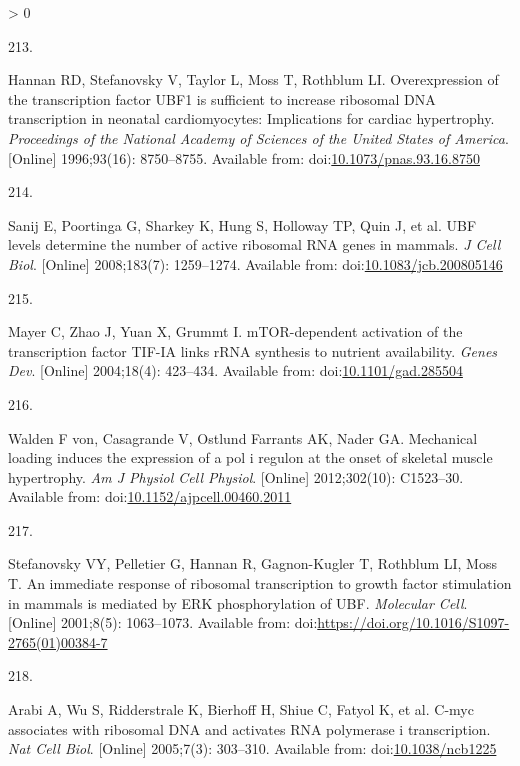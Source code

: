 \documentclass[twoside,10pt]{gihclass} %
\newlength{\cslhangindent}
\newlength{\csllabelwidth}
\newenvironment{CSLReferences}[3] %
 {%
  \setlength{\parindent}{0pt}
  \ifodd #1 \everypar{\setlength{\hangindent}{\cslhangindent}}\ignorespaces\fi
  \ifnum #2 > 0
  \setlength{\parskip}{#2\baselineskip}
  \fi
 }%
 {}
\newcommand{\CSLLeftMargin}[1]{\parbox[t]{\maxof{\widthof{#1}}{\csllabelwidth}}{#1}}
\newcommand{\CSLRightInline}[1]{\parbox[t]{\linewidth}{#1}}
\begin{document}
\begin{CSLReferences}{0}{0}
\leavevmode\hypertarget{ref-RN2566}{}%
\CSLLeftMargin{213. }
\CSLRightInline{Hannan RD, Stefanovsky V, Taylor L, Moss T, Rothblum LI. Overexpression of the transcription factor UBF1 is sufficient to increase ribosomal DNA transcription in neonatal cardiomyocytes: Implications for cardiac hypertrophy. \emph{Proceedings of the National Academy of Sciences of the United States of America}. {[}Online{]} 1996;93(16): 8750--8755. Available from: doi:\href{https://doi.org/10.1073/pnas.93.16.8750}{10.1073/pnas.93.16.8750}}

\leavevmode\hypertarget{ref-RN2556}{}%
\CSLLeftMargin{214. }
\CSLRightInline{Sanij E, Poortinga G, Sharkey K, Hung S, Holloway TP, Quin J, et al. UBF levels determine the number of active ribosomal RNA genes in mammals. \emph{J Cell Biol}. {[}Online{]} 2008;183(7): 1259--1274. Available from: doi:\href{https://doi.org/10.1083/jcb.200805146}{10.1083/jcb.200805146}}

\leavevmode\hypertarget{ref-RN2851}{}%
\CSLLeftMargin{215. }
\CSLRightInline{Mayer C, Zhao J, Yuan X, Grummt I. mTOR-dependent activation of the transcription factor TIF-IA links rRNA synthesis to nutrient availability. \emph{Genes Dev}. {[}Online{]} 2004;18(4): 423--434. Available from: doi:\href{https://doi.org/10.1101/gad.285504}{10.1101/gad.285504}}

\leavevmode\hypertarget{ref-RN1828}{}%
\CSLLeftMargin{216. }
\CSLRightInline{Walden F von, Casagrande V, Ostlund Farrants AK, Nader GA. Mechanical loading induces the expression of a pol i regulon at the onset of skeletal muscle hypertrophy. \emph{Am J Physiol Cell Physiol}. {[}Online{]} 2012;302(10): C1523--30. Available from: doi:\href{https://doi.org/10.1152/ajpcell.00460.2011}{10.1152/ajpcell.00460.2011}}

\leavevmode\hypertarget{ref-RN2604}{}%
\CSLLeftMargin{217. }
\CSLRightInline{Stefanovsky VY, Pelletier G, Hannan R, Gagnon-Kugler T, Rothblum LI, Moss T. An immediate response of ribosomal transcription to growth factor stimulation in mammals is mediated by ERK phosphorylation of UBF. \emph{Molecular Cell}. {[}Online{]} 2001;8(5): 1063--1073. Available from: doi:\url{https://doi.org/10.1016/S1097-2765(01)00384-7}}

\leavevmode\hypertarget{ref-RN1834}{}%
\CSLLeftMargin{218. }
\CSLRightInline{Arabi A, Wu S, Ridderstrale K, Bierhoff H, Shiue C, Fatyol K, et al. C-myc associates with ribosomal DNA and activates RNA polymerase i transcription. \emph{Nat Cell Biol}. {[}Online{]} 2005;7(3): 303--310. Available from: doi:\href{https://doi.org/10.1038/ncb1225}{10.1038/ncb1225}}


\end{CSLReferences}
\end{document}
